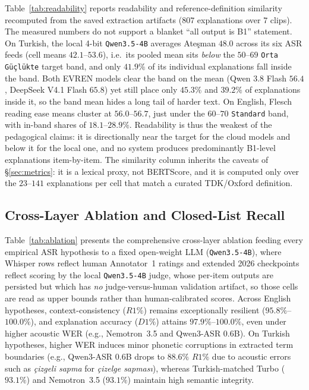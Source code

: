 \documentclass[conference]{IEEEtran}
\begin{document}
Table~\ref{tab:readability} reports readability and reference-definition similarity recomputed from the saved extraction artifacts ($807$ explanations over $7$ clips). The measured numbers do not support a blanket ``all output is B1'' statement. On Turkish, the local 4-bit \texttt{Qwen3.5-4B} averages Ate\c{s}man $48.0$ across its six ASR feeds (cell means $42.1$--$53.6$), i.e.\ its pooled mean sits \emph{below} the $50$--$69$ \texttt{Orta G\"u\c{c}l\"ukte} target band, and only $41.9\%$ of its individual explanations fall inside the band. Both EVREN models clear the band on the mean (Qwen 3.8 Flash $56.4$, DeepSeek V4.1 Flash $65.8$) yet still place only $45.3\%$ and $39.2\%$ of explanations inside it, so the band mean hides a long tail of harder text. On English, Flesch reading ease means cluster at $56.0$--$56.7$, just under the $60$--$70$ \texttt{Standard} band, with in-band shares of $18.1$--$28.9\%$. Readability is thus the weakest of the pedagogical claims: it is directionally near the target for the cloud models and below it for the local one, and no system produces predominantly B1-level explanations item-by-item. The similarity column inherits the caveats of \S\ref{sec:metrics}: it is a lexical proxy, not BERTScore, and it is computed only over the $23$--$141$ explanations per cell that match a curated TDK/Oxford definition.



\subsection{Cross-Layer Ablation and Closed-List Recall}
\label{sec:gold-recall}

Table~\ref{tab:ablation} presents the comprehensive cross-layer ablation feeding every empirical ASR hypothesis to a fixed open-weight LLM (\texttt{Qwen3.5-4B}), where Whisper rows reflect human Annotator~1 ratings and extended 2026 checkpoints reflect scoring by the local \texttt{Qwen3.5-4B} judge, whose per-item outputs are persisted but which has \emph{no} judge-versus-human validation artifact, so those cells are read as upper bounds rather than human-calibrated scores. Across English hypotheses, context-consistency ($R1\%$) remains exceptionally resilient ($95.8\%$--$100.0\%$), and explanation accuracy ($D1\%$) attains $97.9\%$--$100.0\%$, even under higher acoustic WER (e.g., Nemotron~3.5 and Qwen3-ASR 0.6B). On Turkish hypotheses, higher WER induces minor phonetic corruptions in extracted term boundaries (e.g., Qwen3-ASR 0.6B drops to $88.6\%$ $R1\%$ due to acoustic errors such as \emph{çizgeli sapma} for \emph{çizelge sapması}), whereas Turkish-matched Turbo ($93.1\%$) and Nemotron~3.5 ($93.1\%$) maintain high semantic integrity. 
\end{document}
